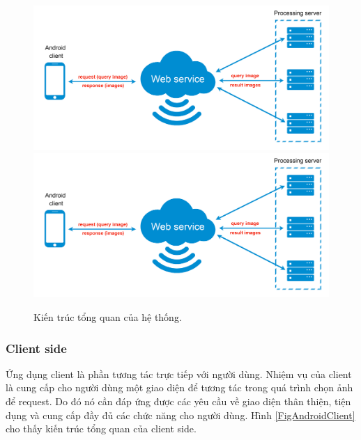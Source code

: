 \begin{figure}[!htbp]
  \begin{center}
    \leavevmode
    \ifpdf
      \includegraphics[scale=0.14]{architecture}
    \else
      \includegraphics[scale=0.14]{architecture}
    \fi
    \caption[Kiến trúc tổng quan của hệ thống]{Kiến trúc tổng quan của hệ thống.}
    \label{FigArchitecture}
  \end{center}
\end{figure}

\subsubsection{Client side}
Ứng dụng client là phần tương tác trực tiếp với người dùng. Nhiệm vụ của client là cung cấp cho người dùng một giao diện để tương tác trong quá trình chọn ảnh để request. Do đó nó cần đáp ứng được các yêu cầu về giao diện thân thiện, tiện dụng và cung cấp đầy đủ các chức năng cho người dùng. Hình \ref{FigAndroidClient} cho thấy kiến trúc tổng quan của client side.


